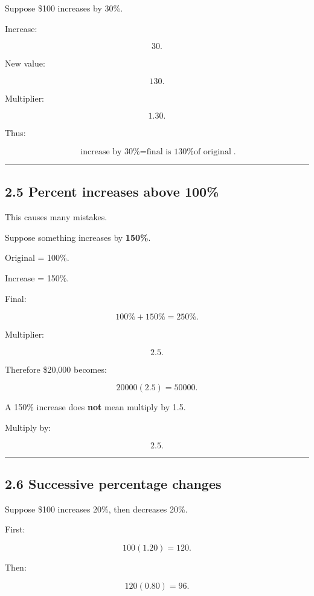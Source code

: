\documentclass[
]{article}
\begin{document}
Suppose \$100 increases by 30\%.

Increase:

\[
30.
\]

New value:

\[
130.
\]

Multiplier:

\[
1.30.
\]

Thus:

\[
\boxed{\text{increase by 30\%}=\text{final is 130\% of original}}.
\]

\begin{center}\rule{0.5\linewidth}{0.5pt}\end{center}

\subsection{2.5 Percent increases above
100\%}\label{percent-increases-above-100}

This causes many mistakes.

Suppose something increases by \textbf{150\%}.

Original = 100\%.

Increase = 150\%.

Final:

\[
100\%+150\%=250\%.
\]

Multiplier:

\[
\boxed{2.5}.
\]

Therefore \$20,000 becomes:

\[
20000(2.5)=50000.
\]

A 150\% increase does \textbf{not} mean multiply by 1.5.

Multiply by:

\[
\boxed{2.5}.
\]

\begin{center}\rule{0.5\linewidth}{0.5pt}\end{center}

\subsection{2.6 Successive percentage
changes}\label{successive-percentage-changes}

Suppose \$100 increases 20\%, then decreases 20\%.

First:

\[
100(1.20)=120.
\]

Then:

\[
120(0.80)=96.
\]
\end{document}

